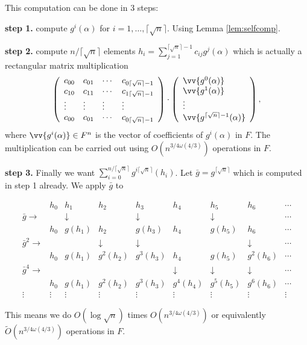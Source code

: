 \documentclass[sigconf]{acmart}
\newcommand{\osumcost}{O(n^{3/4 \omega(4/3)})}
\newcommand{\osumcosttilde}{\tilde{O}(n^{3/4 \omega(4/3)})}
\theoremstyle{acmplain}
\begin{document}
This computation can be done in 3 steps:

\textbf{step 1.} compute $g^i(\alpha)$ for $i = 1, \ldots , \lceil \sqrt{n} \rceil$. Using Lemma \ref{lem:selfcomp}.

\textbf{step 2.} compute $n/\lceil \sqrt{n} \rceil$ elements $h_i = \sum_{j = 1}^ {\lceil \sqrt{n} \rceil-1}c_{ij}g^{j}(\alpha)$ which is actually a rectangular matrix multiplication 
\begin{equation}
\left(\begin{array}{llll}
c_{00} & c_{01} & \cdots & c_{0\lceil \sqrt{n} \rceil -1}\\
c_{10} & c_{11} & \cdots & c_{1\lceil \sqrt{n} \rceil -1}\\
\vdots & \vdots & \vdots & \vdots \\
c_{00} & c_{01} & \cdots & c_{0\lceil \sqrt{n} \rceil -1}\\
\end{array}\right)\cdot 
\left(\begin{array}{l}
\vv{g^0(\alpha)}\\
\vv{g^1(\alpha)}\\
\vdots\\
\vv{g^{\lceil \sqrt{n} \rceil -1}(\alpha)}
\end{array}\right),
\end{equation}
where $\vv{g^i(\alpha)} \in F^n$ is the vector of coefficients of $g^i(\alpha)$ in $F$. The multiplication can be 
carried out using $\osumcost$ operations in $F$.

\textbf{step 3.} Finally we want $\sum_{i = 0}^{n/\lceil \sqrt{n} \rceil} g^{i\lceil \sqrt{n} \rceil}(h_i)$. Let
$\bar{g} = g^{\lceil \sqrt{n} \rceil}$ which is computed in step 1 already. We apply $\bar{g}$ to 
\begin{footnotesize}
$$
\begin{array}{lllllllll}
&h_0 & h_1 & h_2 & h_3 & h_4 & h_5 & h_6 &  \cdots \\
\bar{g} \rightarrow &	& \downarrow & & \downarrow & & \downarrow & &  \cdots \\
&h_0 & g(h_1) & h_2 & g(h_3) & h_4 & g(h_5) & h_6 &  \cdots \\	
\bar{g}^2 \rightarrow &	&  & \downarrow& \downarrow & &  &\downarrow &  \cdots \\
&h_0 & g(h_1) & g^2(h_2) & g^3(h_3) & h_4 & g(h_5) & g^2(h_6) & \cdots \\	
\bar{g}^4 \rightarrow&	&  & &  & \downarrow& \downarrow &\downarrow & \cdots \\
&h_0 & g(h_1) & g^2(h_2) & g^3(h_3) & g^4(h_4) & g^5(h_5) & g^6(h_6) &  \cdots \\		
\vdots & \vdots & \vdots & \vdots & \vdots & \vdots & \vdots & \vdots & \vdots 
\end{array}
$$
\end{footnotesize}
This means we do $O(\log \sqrt{n})$ times $\osumcost$ or equivalently $\osumcosttilde$ operations in $F$. 
\end{document}
